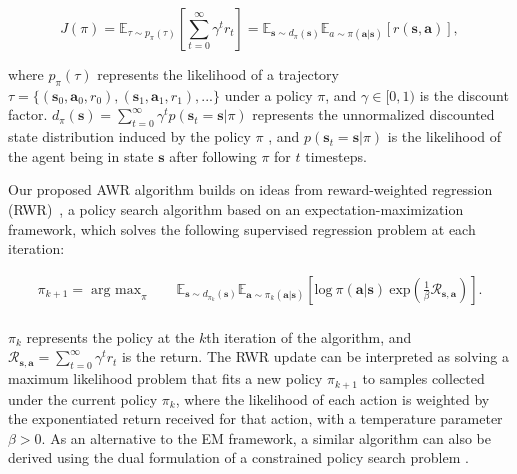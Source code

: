 \begin{equation}
     J(\pi) = \mathbb{E}_{\tau \sim p_\pi(\tau)}\left[\sum_{t=0}^\infty \gamma^t r_t \right] = \mathbb{E}_{{\mathbf{s}} \sim d_\pi({\mathbf{s}})} \mathbb{E}_{a \sim \pi({\mathbf{a}}|{\mathbf{s}})} \left[ r({\mathbf{s}}, {\mathbf{a}})\right],
     \label{eqn:RLObjective}
 \end{equation}

where $p_\pi(\tau)$ represents the likelihood of a trajectory $\tau = \{\left({\mathbf{s}}_0, {\mathbf{a}}_0, r_0 \right), \left({\mathbf{s}}_1, {\mathbf{a}}_1, r_1 \right), ... \}$ under a policy $\pi$, and $\gamma \in [0, 1)$ is the discount factor. $d_\pi({\mathbf{s}}) = \sum_{t=0}^\infty \gamma^t p({\mathbf{s}}_t = {\mathbf{s}} | \pi)$ represents the unnormalized discounted state distribution induced by the policy $\pi$ \citep{Sutton1998}, and $p({\mathbf{s}}_t = {\mathbf{s}} | \pi)$ is the likelihood of the agent being in state ${\mathbf{s}}$ after following $\pi$ for $t$ timesteps.

Our proposed AWR algorithm builds on ideas from reward-weighted regression (RWR)~\citep{Peters2010REP}, a policy search algorithm based on an expectation-maximization framework, which solves the following supervised regression problem at each iteration:

\begin{equation}
\begin{aligned}
    \pi_{k+1} = \mathop{\mathrm{arg \ max}}_{\pi} \quad & \mathbb{E}_{{\mathbf{s}} \sim d_{\pi_k}({\mathbf{s}})} \mathbb{E}_{{\mathbf{a}} \sim \pi_{k}({\mathbf{a}}|{\mathbf{s}})} \left[ \mathrm{log} \ \pi({\mathbf{a}} | {\mathbf{s}}) \ \mathrm{exp}\left( \frac{1}{\beta} \mathcal{R}_{{\mathbf{s}},{\mathbf{a}}} \right)\right] .\\
\end{aligned}
\label{eqn:RWR}
\end{equation}

$\pi_k$ represents the policy at the $k$th iteration of the algorithm, and $\mathcal{R}_{{\mathbf{s}},{\mathbf{a}}} = \sum_{t=0}^\infty \gamma^t r_t$ is the return. The RWR update can be interpreted as solving a maximum likelihood problem that fits a new policy $\pi_{k+1}$ to samples collected under the current policy $\pi_k$, where the likelihood of each action is weighted by the exponentiated return received for that action, with a temperature parameter $\beta >0$. As an alternative to the EM framework, a similar algorithm can also be derived using the dual formulation of a constrained policy search problem \citep{Peters2010REP}.

